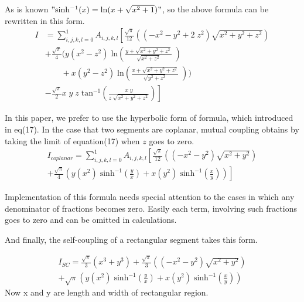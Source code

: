 \documentclass[final,5p,times,twocolumn]{elsarticle}
\begin{document}
As is known $"\mathrm{sinh^{-1}}(x) = \mathrm{ln}(x+\sqrt{x^2 + 1})"$,
so the above formula can be rewritten in this form.
\begin{equation}\label {eq:18}
\begin{array}{ll}
I&=\sum_{i,j,k,l=0}^1 A_{i,j,k,l}\left[\frac {\sqrt{\pi} } {12} \left((-x^2-y^2+2\;z^2)\sqrt{x^2 + y^2 + z^2} \right)\right.  \\

& + \frac {\sqrt{\pi} } {4} \bigg( y(x^2 - z^2)\;\mathrm{ln}(\frac{y+\sqrt{ {x^2 + y^2 + z^2}}}{\sqrt{x^2 + z^2}}\;)\\
&\ \ \ \ \ \ \ \ \ +x(y^2-z^2)\; \mathrm{ln}(\frac{x+\sqrt{ {x^2 + y^2 + z^2}}}{\sqrt{y^2 + z^2}}\;)  \bigg)\\ 
&- \left. \frac {\sqrt{\pi} } {2}x \;y\;z\;\mathrm{tan^{-1}}(\frac{x\;y}{z\;\sqrt{x^2+y^2 + z^2}} ) \right]

\end{array}
\end{equation}

In this paper, we prefer to use the hyperbolic form of formula, which introduced in eq(17).
In the case that two segments are coplanar, mutual coupling obtains by taking the limit of equation(17) when $z$ goes to zero.
\begin{equation}\label {eq:19}
\begin{array}{l}
I_{coplanar}=\sum_{i,j,k,l=0}^1 A_{i,j,k,l}\left[\frac {\sqrt{\pi} } {12} \left((-x^2-y^2)\sqrt{x^2 + y^2} \right) \right. \\

 + \left. \frac {\sqrt{\pi} } {4} \left( y(x^2 )\;\mathrm{sinh^{-1}}(\frac{y}{x })+x(y^2)\;\mathrm{sinh^{-1}}(\frac{x}{y})  \right) \right]
\end{array}
\end{equation}

Implementation of this formula needs special attention to the cases in which any denominator of fractions becomes zero. Easily each term, involving such fractions goes to zero and can be omitted in calculations.


And finally, the self-coupling of a rectangular segment takes this form.

\begin{equation}\label {eq:20}
\begin{array}{l}
I_{SC} = \frac {\sqrt{\pi} } {3} (x^3+y^3)
+ \frac {\sqrt{\pi} } {3} \left((-x^2-y^2) \sqrt{x^2 + y^2} \right)\nonumber \\ +\sqrt{\pi} \left( y(x^2 )\;\mathrm{sinh^{-1}}(\frac{y}{x})+x(y^2)\;\mathrm{sinh^{-1}}(\frac{x}{y})  \right)
\end{array}
\end{equation}
Now x and y are length and width of rectangular region.
\end{document}
